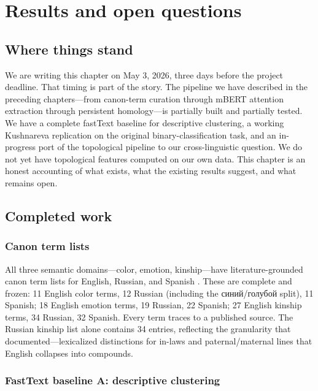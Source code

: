 \chapter{Results and open questions}
\label{ch:results}

\section{Where things stand}

We are writing this chapter on May 3, 2026, three days before the project deadline. That timing is part of the story. The pipeline we have described in the preceding chapters---from canon-term curation through mBERT attention extraction through persistent homology---is partially built and partially tested. We have a complete fastText baseline for descriptive clustering, a working Kushnareva replication on the original binary-classification task, and an in-progress port of the topological pipeline to our cross-linguistic question. We do not yet have topological features computed on our own data. This chapter is an honest accounting of what exists, what the existing results suggest, and what remains open.

\section{Completed work}

\subsection{Canon term lists}

All three semantic domains---color, emotion, kinship---have literature-grounded canon term lists for English, Russian, and Spanish \parencite{berlin1969, wierzbicka1999, murdock1949}. These are complete and frozen: 11 English color terms, 12 Russian (including the синий/голубой split), 11 Spanish; 18 English emotion terms, 19 Russian, 22 Spanish; 27 English kinship terms, 34 Russian, 32 Spanish. Every term traces to a published source. The Russian kinship list alone contains 34 entries, reflecting the granularity that \textcite{friedrich1964} documented---lexicalized distinctions for in-laws and paternal/maternal lines that English collapses into compounds.

\subsection{FastText baseline A: descriptive clustering}

